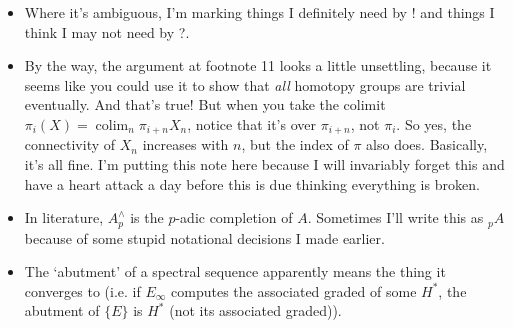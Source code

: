 \documentclass{MetricNotes2023}
\DeclareMathOperator{\colim}{colim}
\begin{document}
\begin{itemize}
\item Where it's ambiguous, I'm marking things I definitely need by ! and things I think I may not need by ?.

\item By the way, the argument at footnote 11 looks a little unsettling, because it seems like you could use it to show that \textit{all} homotopy groups are trivial eventually. And that's true! But when you take the colimit \(\pi_i(X)=\colim_n \pi_{i+n}X_n\), notice that it's over \(\pi_{i+n}\), not \(\pi_{i}\). So yes, the connectivity of \(X_n\) increases with \(n\), but the index of \(\pi\) also does. Basically, it's all fine. I'm putting this note here because I will invariably forget this and have a heart attack a day before this is due thinking everything is broken. 

\item In literature, \(A^\wedge_p\) is the \(p\)-adic completion of \(A\). Sometimes I'll write this as \(\text{}_pA\) because of some stupid notational decisions I made earlier.

\item The `abutment' of a spectral sequence apparently means the thing it converges to (i.e. if \(E_\infty\) computes the associated graded of some \(H^*\), the abutment of \(\{E\}\) is \(H^*\) (not its associated graded)). 
\end{itemize}


\printbibliography
\end{document}
